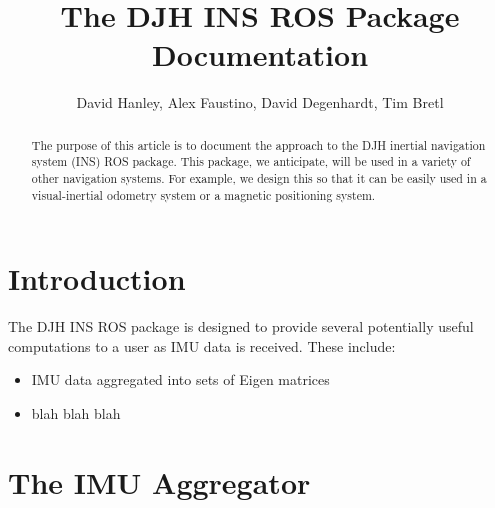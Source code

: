 \documentclass[11pt,a4paper]{article}
\title{The DJH INS ROS Package Documentation}
\author{David Hanley, Alex Faustino, David Degenhardt, Tim Bretl}
\begin{document}
\maketitle

\begin{abstract}
	The purpose of this article is to document the approach to the DJH inertial navigation system (INS) ROS package. This package, we anticipate, will be used in a variety of other navigation systems. For example, we design this so that it can be easily used in a visual-inertial odometry system or a magnetic positioning system.
\end{abstract}

\section{Introduction}

The DJH INS ROS package is designed to provide several potentially useful computations to a user as IMU data is received. These include:
\begin{itemize}
	\item IMU data aggregated into sets of Eigen matrices
	\item blah blah blah
\end{itemize}

\section{The IMU Aggregator}
\end{document}
